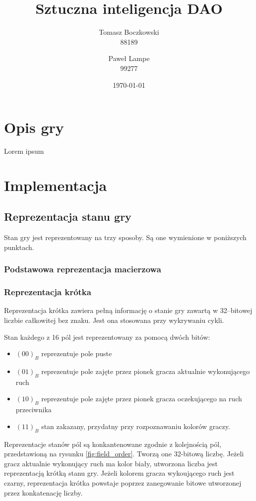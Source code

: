 \documentclass{scrartcl}
\title{Sztuczna inteligencja DAO}
\date{\today}
\author{Tomasz Boczkowski\\ 88189 \and Paweł Lampe\\ 99277}
\begin{document}


\section{Opis gry}

Lorem ipsum

\section{Implementacja}

\subsection{Reprezentacja stanu gry}

Stan gry jest reprezentowany na trzy sposoby. Są one wymienione w
poniższych punktach.

\subsubsection{Podstawowa reprezentacja macierzowa}

\subsubsection{Reprezentacja krótka}

Reprezentacja krótka zawiera pełną informację o stanie gry zawartą
w 32--bitowej liczbie całkowitej bez znaku. Jest ona stosowana przy
wykrywaniu cykli.

Stan każdego z 16 pól jest reprezentowany za pomocą dwóch
bitów:
\begin{itemize}
\item $(00)_B$ reprezentuje pole puste
\item $(01)_B$ reprezentuje pole zajęte przez pionek gracza aktualnie
  wykonującego ruch
\item $(10)_B$ reprezentuje pole zajęte przez pionek gracza
  oczekującego na ruch przeciwnika
\item $(11)_B$ stan zakazany, przydatny przy rozpoznawaniu kolorów
  graczy.
\end{itemize}

Reprezentacje stanów pól są konkantenowane zgodnie z kolejnością pól,
przedstawioną na rysunku \ref{fig:field_order}. Tworzą one 32-bitową
liczbę. Jeżeli gracz aktualnie wykonujący ruch ma kolor biały,
utworzona liczba jest reprezentacją krótką stanu gry. Jeżeli kolorem
gracza wykoującego ruch jest czarny, reprezentacja krótka powstaje 
poprzez zanegowanie bitowe utworzonej przez konkatenację liczby.
\end{document}
